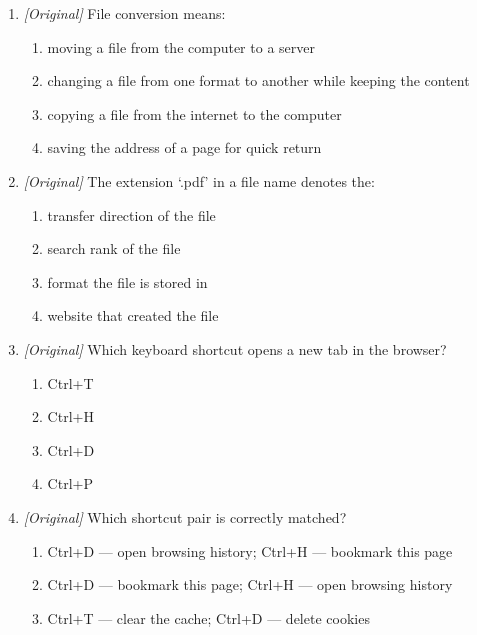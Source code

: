 \begin{enumerate}[label=\textbf{Q\arabic*.}, leftmargin=*]
  \begin{enumerate}[label=\Alph*.]
    \item upload, then download
    \item download, then upload
    \item convert, then bookmark
    \item browse, then index
  \end{enumerate}
\item \textit{[Original]} File conversion means:
  \begin{enumerate}[label=\Alph*.]
    \item moving a file from the computer to a server
    \item changing a file from one format to another while keeping the content
    \item copying a file from the internet to the computer
    \item saving the address of a page for quick return
  \end{enumerate}
\item \textit{[Original]} The extension `.pdf' in a file name denotes the:
  \begin{enumerate}[label=\Alph*.]
    \item transfer direction of the file
    \item search rank of the file
    \item format the file is stored in
    \item website that created the file
  \end{enumerate}
\item \textit{[Original]} Which keyboard shortcut opens a new tab in the
  browser?
  \begin{enumerate}[label=\Alph*.]
    \item Ctrl+T
    \item Ctrl+H
    \item Ctrl+D
    \item Ctrl+P
  \end{enumerate}
\item \textit{[Original]} Which shortcut pair is correctly matched?
  \begin{enumerate}[label=\Alph*.]
    \item Ctrl+D --- open browsing history; Ctrl+H --- bookmark this page
    \item Ctrl+D --- bookmark this page; Ctrl+H --- open browsing history
    \item Ctrl+T --- clear the cache; Ctrl+D --- delete cookies

\end{enumerate}
\end{enumerate}
